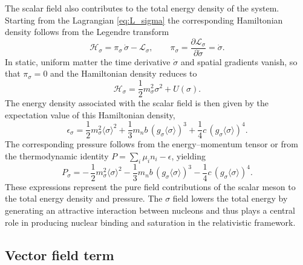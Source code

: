 The scalar field also contributes to the total energy density of the system.
Starting from the Lagrangian \eqref{eq:L_sigma} the corresponding Hamiltonian 
density follows from the Legendre transform
\[
\mathcal{H}_{\sigma}
= \pi_{\sigma}\,\dot{\sigma} - \mathcal{L}_{\sigma},
\qquad
\pi_{\sigma} = \frac{\partial\mathcal{L}_{\sigma}}{\partial\dot{\sigma}}
              = \dot{\sigma}.
\]
In static, uniform matter the time derivative $\dot{\sigma}$ and spatial
gradients vanish, so that $\pi_{\sigma}=0$ and the Hamiltonian density reduces to
\[
\mathcal{H}_{\sigma}
= \frac{1}{2}m_{\sigma}^{2}\sigma^{2} + U(\sigma).
\]
The energy density associated with the scalar field is then given by the
expectation value of this Hamiltonian density,
\begin{equation}
\epsilon_{\sigma}
= \frac{1}{2}m_{\sigma}^{2}\langle\sigma\rangle^{2}
  + \frac{1}{3}m_{n}b\,(g_{\sigma}\langle\sigma\rangle)^{3}
  + \frac{1}{4}c\,(g_{\sigma}\langle\sigma\rangle)^{4}.
\label{eq:epsilon_sigma}
\end{equation}
The corresponding pressure follows from the
energy–momentum tensor or from the thermodynamic identity
$P = \sum_i \mu_i n_i - \epsilon$, yielding
\begin{equation}
P_{\sigma}
= -\,\frac{1}{2}m_{\sigma}^{2}\langle\sigma\rangle^{2}
  - \frac{1}{3}m_{n}b\,(g_{\sigma}\langle\sigma\rangle)^{3}
  - \frac{1}{4}c\,(g_{\sigma}\langle\sigma\rangle)^{4}.
\label{eq:pressure_sigma}
\end{equation}
These expressions represent the pure field contributions of the scalar meson to
the total energy density and pressure. The $\sigma$ field lowers the total
energy by generating an attractive interaction between nucleons and thus plays
a central role in producing nuclear binding and saturation in the relativistic
framework.

\subsection*{Vector field term}
\label{subsec:omega_term}

